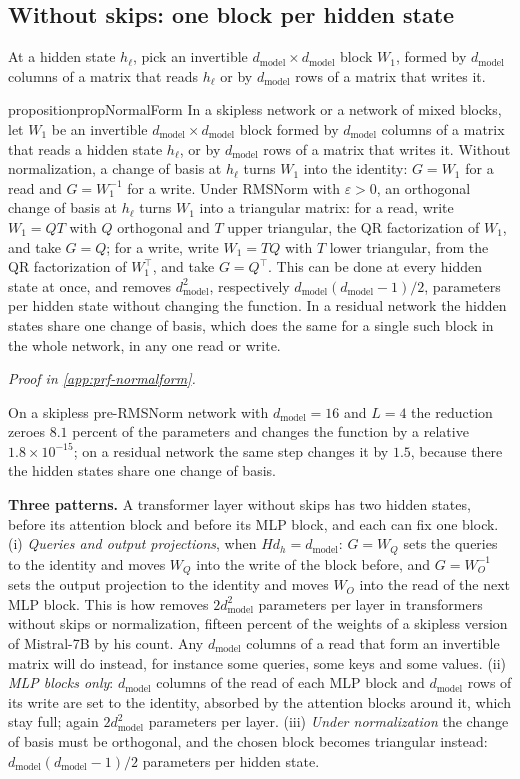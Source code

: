 \documentclass[10pt]{article}
\theoremstyle{definition}
\theoremstyle{remark}
\newcommand{\dm}{d_{\mathrm{model}}}
\newcommand{\para}[1]{\smallskip\noindent\textbf{#1}\hspace{0.5em}}
\newcommand{\proofin}[1]{\par\vspace{-0.4\baselineskip}\noindent\hfill{\small\itshape Proof in \cref{#1}.}\par\smallskip}
\begin{document}
\subsection{Without skips: one block per hidden state}\label{sec:skipless}

At a hidden state $h_\ell$, pick an invertible $\dm \times \dm$ block $W_1$, formed by $\dm$ columns of a matrix that reads $h_\ell$ or by $\dm$ rows of a matrix that writes it.

\begin{restatable}{proposition}{propNormalForm}\label{prop:normalform}
In a skipless network or a network of mixed blocks, let $W_1$ be an invertible $\dm \times \dm$ block formed by $\dm$ columns of a matrix that reads a hidden state $h_\ell$, or by $\dm$ rows of a matrix that writes it. Without normalization, a change of basis at $h_\ell$ turns $W_1$ into the identity: $G = W_1$ for a read and $G = W_1^{-1}$ for a write. Under RMSNorm with $\varepsilon > 0$, an orthogonal change of basis at $h_\ell$ turns $W_1$ into a triangular matrix: for a read, write $W_1 = QT$ with $Q$ orthogonal and $T$ upper triangular, the QR factorization of $W_1$, and take $G = Q$; for a write, write $W_1 = TQ$ with $T$ lower triangular, from the QR factorization of $W_1^\top$, and take $G = Q^\top$. This can be done at every hidden state at once, and removes $\dm^2$, respectively $\dm(\dm-1)/2$, parameters per hidden state without changing the function. In a residual network the hidden states share one change of basis, which does the same for a single such block in the whole network, in any one read or write.
\end{restatable}
\proofin{app:prf-normalform}

On a skipless pre-RMSNorm network with $\dm = 16$ and $L = 4$ the reduction zeroes $8.1$ percent of the parameters and changes the function by a relative $1.8\times10^{-15}$; on a residual network the same step changes it by $1.5$, because there the hidden states share one change of basis.

\para{Three patterns.} A transformer layer without skips has two hidden states, before its attention block and before its MLP block, and each can fix one block. (i) \emph{Queries and output projections}, when $Hd_h = \dm$: $G = W_Q$ sets the queries to the identity and moves $W_Q$ into the write of the block before, and $G = W_O^{-1}$ sets the output projection to the identity and moves $W_O$ into the read of the next MLP block. This is how \citet{graef2024tricks} removes $2\dm^2$ parameters per layer in transformers without skips or normalization, fifteen percent of the weights of a skipless version of Mistral-7B by his count. Any $\dm$ columns of a read that form an invertible matrix will do instead, for instance some queries, some keys and some values. (ii) \emph{MLP blocks only}: $\dm$ columns of the read of each MLP block and $\dm$ rows of its write are set to the identity, absorbed by the attention blocks around it, which stay full; again $2\dm^2$ parameters per layer. (iii) \emph{Under normalization} the change of basis must be orthogonal, and the chosen block becomes triangular instead: $\dm(\dm-1)/2$ parameters per hidden state.
\end{document}
